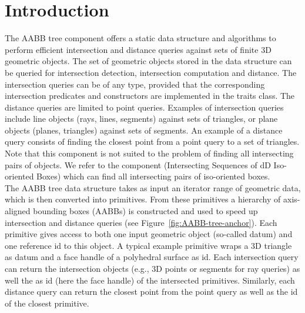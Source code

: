 \section{Introduction}
\label{AABB_tree_section_intro}

The AABB tree component offers a static data structure and algorithms to perform efficient intersection and distance queries against sets of finite 3D geometric objects. The set of geometric objects stored in the data structure can be queried for intersection detection, intersection computation and distance. The intersection queries can be of any type, provided that the corresponding intersection predicates and constructors are implemented in the traits class. The distance queries are limited to point queries. Examples of intersection queries include line objects (rays, lines, segments) against sets of triangles, or plane objects (planes, triangles) against sets of segments. An example of a distance query consists of finding the closest point from a point query to a set of triangles.\\

Note that this component is not suited to the problem of finding all intersecting pairs of objects. We refer to the component  (Intersecting Sequences of dD Iso-oriented Boxes) which can find all intersecting pairs of iso-oriented boxes.\\

The AABB tree data structure takes as input an iterator range of geometric data, which is then converted into primitives. From these primitives a hierarchy of axis-aligned bounding boxes (AABBs) is constructed and used to speed up intersection and distance queries (see Figure~\ref{fig:AABB-tree-anchor}). 
Each primitive gives access to both one input geometric object (so-called datum) and one reference id to this object. A typical example primitive wraps a 3D triangle as datum and a face handle of a polyhedral surface as id. Each intersection query can return the intersection objects (e.g., 3D points or segments for ray queries) as well the as id (here the face handle) of the intersected primitives. Similarly, each distance query can return the closest point from the point query as well as the id of the closest primitive. 

